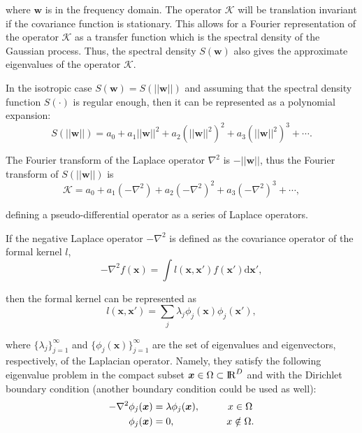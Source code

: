 \documentclass[onecolumn,a4paper,11pt]{article}
\begin{document}
\noindent where $\bm{w}$ is in the frequency domain. The operator $\mathcal{K}$ will be translation invariant if the covariance function is stationary. This allows for a Fourier representation of the operator $\mathcal{K}$ as a transfer function which is the spectral density of the Gaussian process. 
%
Thus, the spectral density $S(\bm{w})$ also gives the approximate eigenvalues of the operator $\mathcal{K}$.

In the isotropic case $S(\bm{w}) = S(||\bm{w}||)$ and assuming that the spectral density function $S(\cdot)$ is regular enough, then it can be represented as a polynomial expansion:
%
\begin{equation}\label{ch5_eq_S}
S(||\bm{w}||)=a_0+a_1||\bm{w}||^2+a_2(||\bm{w}||^2)^2+a_3(||\bm{w}||^2)^3+\cdots.
\end{equation}

\noindent The Fourier transform of the Laplace operator $\nabla^2$ is $-||\bm{w}||$, thus the Fourier transform of $S(||\bm{w}||)$ is
%
\begin{equation}\label{ch5_eq_K}
\mathcal{K}=a_0+a_1(-\nabla^2)+a_2(-\nabla^2)^2+a_3(-\nabla^2)^3+\cdots,
\end{equation}

\noindent defining a pseudo-differential operator as a series of Laplace operators.

If the negative Laplace operator $-\nabla^2$ is defined as the covariance operator of the formal kernel $l$,
%
\begin{equation*}
-\nabla^2 f(\bm{x}) = \int l(\bm{x},\bm{x}') f(\bm{x}') \mathrm{d}\bm{x}',
\end{equation*} 

\noindent then the formal kernel can be represented as 
%
\begin{equation*}
l(\bm{x},\bm{x}')= \sum_j \lambda_j \phi_j(\bm{x}) \phi_j(\bm{x}'),
\end{equation*}

\noindent where $\{\lambda_j\}_{j=1}^{\infty}$ and $\{\phi_j(\bm{x})\}_{j=1}^{\infty}$ are the set of eigenvalues and eigenvectors, respectively, of the Laplacian operator. Namely, they satisfy the following eigenvalue problem in the compact subset $\bm{x} \in \Omega \subset {\rm I\!R}^D$ and with the Dirichlet boundary condition (another boundary condition could be used as well):
%
\begin{align*}
-\nabla^2 \phi_j(\bm{x})&=\lambda \phi_j(\bm{x}), \hspace{1cm}  x\in \Omega \nonumber \\ 
\phi_j(\bm{x})&=0, \hspace{1.85cm} x\notin \Omega.
\end{align*}  
\end{document}

